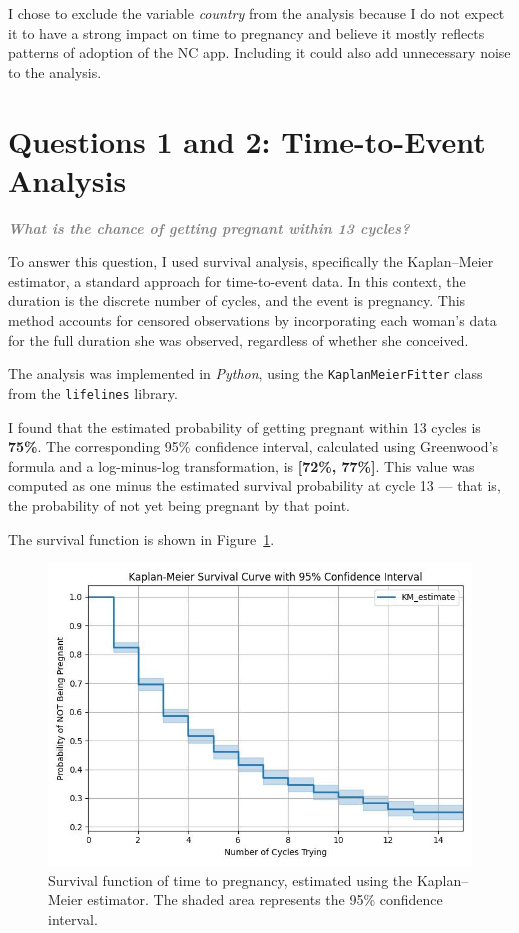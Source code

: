 \documentclass[11pt]{article}
\newcommand{\questiontext}[1]{\vspace{0.5em}\textbf{\textit{\textcolor{gray}{#1}}}}
\begin{document}
I chose to exclude the variable \textit{country} from the analysis because I do not expect it to have a strong impact on time to pregnancy and believe it mostly reflects patterns of adoption of the NC app. Including it could also add unnecessary noise to the analysis.






\section{Questions 1 and 2: Time-to-Event Analysis}
\label{sec:time-to-event}
\questiontext{What is the chance of getting pregnant within 13 cycles?}

To answer this question, I used survival analysis, specifically the Kaplan–Meier estimator, a standard approach for time-to-event data. In this context, the duration is the discrete number of cycles, and the event is pregnancy. This method accounts for censored observations by incorporating each woman's data for the full duration she was observed, regardless of whether she conceived.

The analysis was implemented in \textit{Python}, using the \texttt{KaplanMeierFitter} class from the \texttt{lifelines} library.

I found that the estimated probability of getting pregnant within 13 cycles is \textbf{75\%}. The corresponding 95\% confidence interval, calculated using Greenwood's formula and a log-minus-log transformation, is \textbf{[72\%, 77\%]}. This value was computed as one minus the estimated survival probability at cycle 13 — that is, the probability of not yet being pregnant by that point.

The survival function is shown in Figure~\ref{fig:km_survival}.

\begin{figure}
  \centering
  \includegraphics[width=0.65\linewidth]{plots/Q1_survival_curve.jpg}
  \caption{
    Survival function of time to pregnancy, estimated using the Kaplan–Meier estimator. The shaded area represents the 95\% confidence interval.\\} 
    \label{fig:km_survival}
\end{figure}
\end{document}
